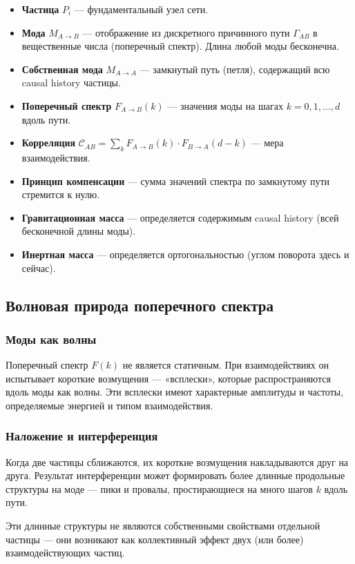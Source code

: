 \documentclass[12pt,a4paper]{article}
\begin{document}
\begin{itemize}
    \item \textbf{Частица} $P_i$ --- фундаментальный узел сети.
    \item \textbf{Мода} $M_{A \to B}$ --- отображение из дискретного причинного пути $\Gamma_{AB}$ в вещественные числа (поперечный спектр). Длина любой моды бесконечна.
    \item \textbf{Собственная мода} $M_{A \to A}$ --- замкнутый путь (петля), содержащий всю causal history частицы.
    \item \textbf{Поперечный спектр} $F_{A \to B}(k)$ --- значения моды на шагах $k = 0, 1, \dots, d$ вдоль пути.
    \item \textbf{Корреляция} $\mathcal{C}_{AB} = \sum_k F_{A \to B}(k) \cdot F_{B \to A}(d-k)$ --- мера взаимодействия.
    \item \textbf{Принцип компенсации} --- сумма значений спектра по замкнутому пути стремится к нулю.
    \item \textbf{Гравитационная масса} --- определяется содержимым causal history (всей бесконечной длины моды).
    \item \textbf{Инертная масса} --- определяется ортогональностью (углом поворота здесь и сейчас).
\end{itemize}

\subsection{Волновая природа поперечного спектра}

\subsubsection{Моды как волны}
Поперечный спектр $F(k)$ не является статичным. При взаимодействиях он испытывает короткие возмущения --- «всплески», которые распространяются вдоль моды как волны. Эти всплески имеют характерные амплитуды и частоты, определяемые энергией и типом взаимодействия.

\subsubsection{Наложение и интерференция}
Когда две частицы сближаются, их короткие возмущения накладываются друг на друга. Результат интерференции может формировать более длинные продольные структуры на моде --- пики и провалы, простирающиеся на много шагов $k$ вдоль пути.

Эти длинные структуры не являются собственными свойствами отдельной частицы --- они возникают как коллективный эффект двух (или более) взаимодействующих частиц.
\end{document}
